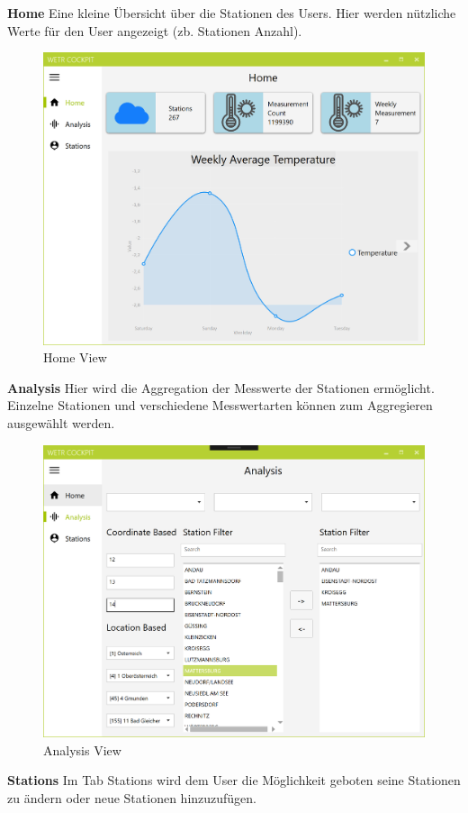 \newpage
\textbf{Home}\newline
Eine kleine Übersicht über die Stationen des Users. Hier werden nützliche Werte für den User angezeigt (zb. Stationen Anzahl).

\begin{figure}[H]
\centering
\includegraphics[width=.7\textwidth]{pictures/Cockpit/Cockpit_2.png}
\caption{Home View}
\label{fig:Wetr.Cockpit.Wpf.HomeView}
\end{figure}
\raggedright

\textbf{Analysis}\newline
Hier wird die Aggregation der Messwerte der Stationen ermöglicht. Einzelne Stationen und verschiedene Messwertarten können zum Aggregieren ausgewählt werden.

\begin{figure}[H]
\centering
\includegraphics[width=.7\textwidth]{pictures/Cockpit/Cockpit_3.png}
\caption{Analysis View}
\label{fig:Wetr.Cockpit.Wpf.Analysis}
\end{figure}
\raggedright

\textbf{Stations}\newline
Im Tab Stations wird dem User die Möglichkeit geboten seine Stationen zu ändern oder neue Stationen hinzuzufügen.

